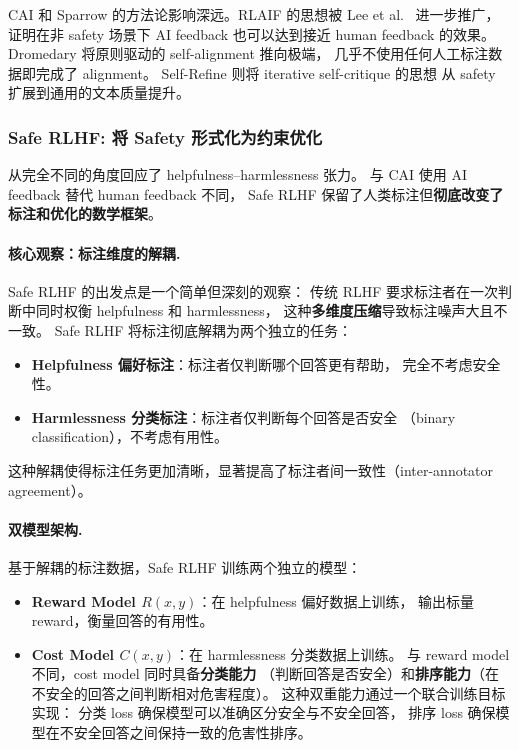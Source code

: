 CAI 和 Sparrow 的方法论影响深远。RLAIF 的思想被 Lee et al.\ \cite{lee2023rlaif} 进一步推广，
证明在非 safety 场景下 AI feedback 也可以达到接近 human feedback 的效果。
Dromedary \cite{sun2023dromedary} 将原则驱动的 self-alignment 推向极端，
几乎不使用任何人工标注数据即完成了 alignment。
Self-Refine \cite{madaan2023selfrefine} 则将 iterative self-critique 的思想
从 safety 扩展到通用的文本质量提升。

\subsubsection{Safe RLHF: 将 Safety 形式化为约束优化}
\label{sec:t3-saferlhf}

 从完全不同的角度回应了 helpfulness--harmlessness 张力。
与 CAI 使用 AI feedback 替代 human feedback 不同，
Safe RLHF 保留了人类标注但\textbf{彻底改变了标注和优化的数学框架}。

\paragraph{核心观察：标注维度的解耦.}
Safe RLHF 的出发点是一个简单但深刻的观察：
传统 RLHF 要求标注者在一次判断中同时权衡 helpfulness 和 harmlessness，
这种\textbf{多维度压缩}导致标注噪声大且不一致。
Safe RLHF 将标注彻底解耦为两个独立的任务：
\begin{itemize}[leftmargin=2em]
  \item \textbf{Helpfulness 偏好标注}：标注者仅判断哪个回答更有帮助，
    完全不考虑安全性。
  \item \textbf{Harmlessness 分类标注}：标注者仅判断每个回答是否安全
    （binary classification），不考虑有用性。
\end{itemize}

\noindent
这种解耦使得标注任务更加清晰，显著提高了标注者间一致性（inter-annotator agreement）。

\paragraph{双模型架构.}
基于解耦的标注数据，Safe RLHF 训练两个独立的模型：
\begin{itemize}[leftmargin=2em]
  \item \textbf{Reward Model $R(x, y)$}：在 helpfulness 偏好数据上训练，
    输出标量 reward，衡量回答的有用性。
  \item \textbf{Cost Model $C(x, y)$}：在 harmlessness 分类数据上训练。
    与 reward model 不同，cost model 同时具备\textbf{分类能力}
    （判断回答是否安全）和\textbf{排序能力}（在不安全的回答之间判断相对危害程度）。
    这种双重能力通过一个联合训练目标实现：
    分类 loss 确保模型可以准确区分安全与不安全回答，
    排序 loss 确保模型在不安全回答之间保持一致的危害性排序。
\end{itemize}

